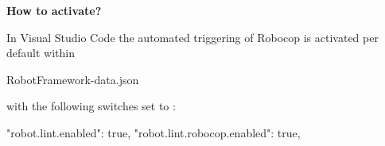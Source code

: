 \vspace{2ex}

\textbf{How to activate?}

In Visual Studio Code the automated triggering of Robocop is activated per default within

\begin{robotlog}
RobotFramework\robotvscode\data\user-data\User\settings.json
\end{robotlog}

with the following switches set to :

\begin{pythoncode}
"robot.lint.enabled": true,
"robot.lint.robocop.enabled": true,
\end{pythoncode}

